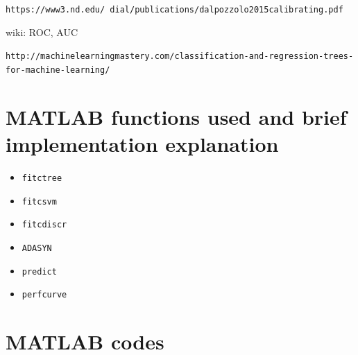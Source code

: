 \documentclass{article}
\begin{document}
\clearpage
\begin{thebibliography}{9}
  
\texttt{https://www3.nd.edu/~dial/publications/dalpozzolo2015calibrating.pdf}

wiki: ROC, AUC

\texttt{http://machinelearningmastery.com/classification-and-regression-trees-for-machine-learning/}

\end{thebibliography}

\begin{appendices}
\section{MATLAB functions used and brief implementation explanation}
\begin{itemize}
	\item \texttt{fitctree}
	\item \texttt{fitcsvm}
	\item \texttt{fitcdiscr}
	\item \texttt{ADASYN}
	\item \texttt{predict}
	\item \texttt{perfcurve}
\end{itemize}

\section{MATLAB codes}




\end{appendices}
\end{document}
